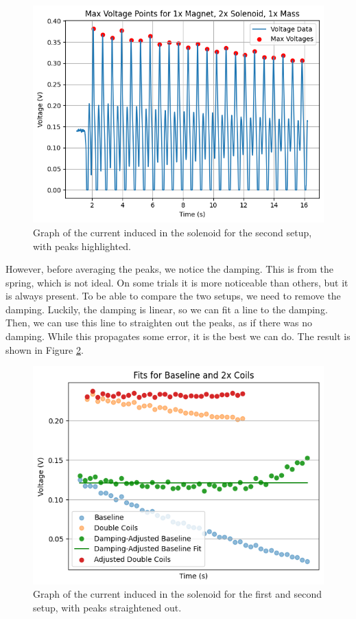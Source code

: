 \documentclass[11pt]{article}
\begin{document}
    \begin{figure}[H]
        \centering
        \includegraphics[width=0.8\linewidth]{resources/images/part1 peak points}
        \caption{Graph of the current induced in the solenoid for the second setup, with peaks highlighted.}
        \label{fig:part1_peak_points}
    \end{figure}

    However, before averaging the peaks, we notice the damping.
    This is from the spring, which is not ideal.
    On some trials it is more noticeable than others, but it is always present.
    To be able to compare the two setups, we need to remove the damping.
    Luckily, the damping is linear, so we can fit a line to the damping.
    Then, we can use this line to straighten out the peaks, as if there was no damping.
    While this propagates some error, it is the best we can do.
    The result is shown in Figure \ref{fig:part1a_straightened_points}.

    \begin{figure}[H]
        \centering
        \includegraphics[width=0.8\linewidth]{resources/images/part1a peaks straightened}
        \caption{Graph of the current induced in the solenoid for the first and second setup, with peaks straightened out.}
        \label{fig:part1a_straightened_points}
    \end{figure}
\end{document}
